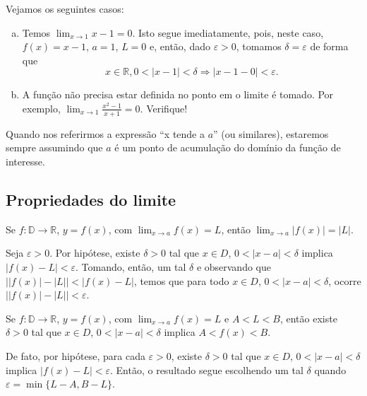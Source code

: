 \begin{ex}
  Vejamos os seguintes casos:
  \begin{enumerate}[a)]
  \item Temos $\lim_{x\to 1}x-1=0$. Isto segue imediatamente, pois, neste caso, $f(x)=x-1$, $a=1$, $L=0$ e, então, dado $\varepsilon>0$, tomamos $\delta=\varepsilon$ de forma que
    \begin{equation}
      x\in\mathbb{R}, 0<|x-1|<\delta \Rightarrow |x-1 - 0|<\varepsilon.
    \end{equation}
  \item A função não precisa estar definida no ponto em o limite é tomado. Por exemplo, $\lim_{x\to 1} \frac{x^2-1}{x+1} = 0$. Verifique!
  \end{enumerate}
\end{ex}

\begin{obs}
  Quando nos referirmos a expressão ``x tende a $a$'' (ou similares), estaremos sempre assumindo que $a$ é um ponto de acumulação do domínio da função de interesse.
\end{obs}

\subsection{Propriedades do limite}

\begin{teo}
  Se $f:\mathbb{D}\to\mathbb{R}$, $y=f(x)$, com $\lim_{x\to a}f(x)=L$, então $\lim_{x\to a}|f(x)|=|L|$.
\end{teo}
\begin{dem}
  Seja $\varepsilon>0$. Por hipótese, existe $\delta>0$ tal que $x\in D$, $0<|x-a|<\delta$ implica $|f(x)-L|<\varepsilon$. Tomando, então, um tal $\delta$ e observando que $\left||f(x)|-|L|\right| < |f(x)-L|$, temos que para todo $x\in D$, $0<|x-a|<\delta$, ocorre $\left||f(x)|-|L|\right|<\varepsilon$.
\end{dem}

\begin{teo}\label{teo:lim_imagem}
  Se $f:\mathbb{D}\to\mathbb{R}$, $y=f(x)$, com $\lim_{x\to a}f(x)=L$ e $A < L < B$, então existe $\delta>0$ tal que $x\in D$, $0<|x-a|<\delta$ implica $A<f(x)<B$.
\end{teo}
\begin{dem}
  De fato, por hipótese, para cada $\varepsilon>0$, existe $\delta>0$ tal que $x\in D$, $0<|x-a|<\delta$ implica $|f(x)-L|<\varepsilon$. Então, o resultado segue escolhendo um tal $\delta$ quando $\varepsilon=\min\{L-A, B-L\}$.
\end{dem}

